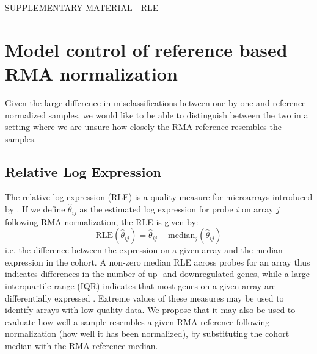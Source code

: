 \documentclass{article}
\begin{document}
\begin{center}
{\huge SUPPLEMENTARY MATERIAL - RLE}\bigskip \\
\end{center}

\section{Model control of reference based RMA normalization}
Given the large difference in misclassifications  between one-by-one and reference normalized samples, we would like to be able to distinguish between the two in a setting where we are unsure how closely the RMA reference resembles the samples.

\subsection{Relative Log Expression}
The relative log expression (RLE)	is a quality measure for microarrays introduced by \citet{Bolstad2004b}. If we define $\hat{\theta}_{ij}$ as the estimated log expression for probe $i$ on array $j$ following RMA normalization, the RLE is given by:
\[
\textrm{RLE}(\hat{\theta}_{ij}) = \hat{\theta}_{ij} - \textrm{median}_j(\hat{\theta}_{ij})
\]
i.e. the difference between the expression on a given array and the median expression in the cohort. A non-zero median RLE across probes for an array thus indicates differences in the number of up- and downregulated genes, while a large interquartile range (IQR) indicates that most genes on a given array are differentially expressed \citep{McCall2011}. Extreme values of these measures may be used to identify arrays with low-quality data. We propose that it may also be used to evaluate how well a sample resembles a given RMA reference following normalization (how well it has been normalized), by substituting the cohort median with the RMA reference median.
\end{document}
